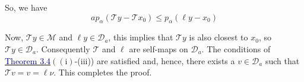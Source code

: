\documentclass[12pt,a4paper,two side]{article}
\begin{document}
So, we have\\
$$
a p_\alpha\left(\mathcal{T} y-\mathcal{T} x_0\right) \leq p_\alpha\left(\ell y-x_0\right)
$$


Now, $\mathcal{T} y \in \mathcal{M}$ and $\ell y \in \mathscr{D}_a$, this implies that $\mathcal{T} y$ is also closest to $x_0$, so $\mathcal{T} y \in \mathscr{D}_a$. Consequently $\mathcal{T}$ and $\ell$ are self-maps on $\mathscr{D}_a$. The conditions of \hyperlink{muc3.4}{\textcolor{Darkblue}{Theorem 3.4}}$\left((\mathrm{i})\right.$-(iii)) are satisfied and, hence, there exists a $v \in \mathscr{D}_a$ such that $\mathcal{T} v=v=\ell \nu$. This completes the proof.















































\vspace{2cm}
\printbibliography
\end{document}
